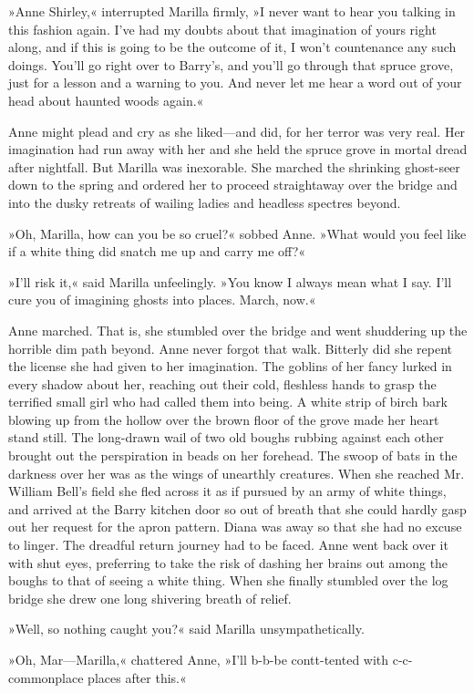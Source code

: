 »Anne Shirley,« interrupted Marilla firmly, »I never want to hear you talking in this fashion again. I've had my doubts about that imagination of yours right along, and if this is going to be the outcome of it, I won't countenance any such doings. You'll go right over to Barry's, and you'll go through that spruce grove, just for a lesson and a warning to you. And never let me hear a word out of your head about haunted woods again.«

Anne might plead and cry as she liked—and did, for her terror was very real. Her imagination had run away with her and she held the spruce grove in mortal dread after nightfall. But Marilla was inexorable. She marched the shrinking ghost-seer down to the spring and ordered her to proceed straightaway over the bridge and into the dusky retreats of wailing ladies and headless spectres beyond.

»Oh, Marilla, how can you be so cruel?« sobbed Anne. »What would you feel like if a white thing did snatch me up and carry me off?«

»I'll risk it,« said Marilla unfeelingly. »You know I always mean what I say. I'll cure you of imagining ghosts into places. March, now.«

Anne marched. That is, she stumbled over the bridge and went shuddering up the horrible dim path beyond. Anne never forgot that walk. Bitterly did she repent the license she had given to her imagination. The goblins of her fancy lurked in every shadow about her, reaching out their cold, fleshless hands to grasp the terrified small girl who had called them into being. A white strip of birch bark blowing up from the hollow over the brown floor of the grove made her heart stand still. The long-drawn wail of two old boughs rubbing against each other brought out the perspiration in beads on her forehead. The swoop of bats in the darkness over her was as the wings of unearthly creatures. When she reached Mr. William Bell's field she fled across it as if pursued by an army of white things, and arrived at the Barry kitchen door so out of breath that she could hardly gasp out her request for the apron pattern. Diana was away so that she had no excuse to linger. The dreadful return journey had to be faced. Anne went back over it with shut eyes, preferring to take the risk of dashing her brains out among the boughs to that of seeing a white thing. When she finally stumbled over the log bridge she drew one long shivering breath of relief.

»Well, so nothing caught you?« said Marilla unsympathetically.

»Oh, Mar—Marilla,« chattered Anne, »I'll b-b-be contt-tented with c-c-commonplace places after this.«